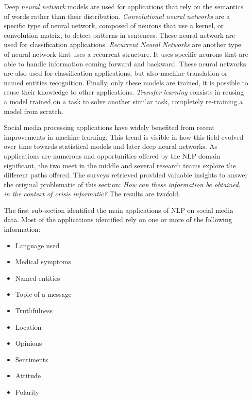 Deep \emph{neural network} models are used for applications that rely on the semantics of words rather than their distribution.
\emph{Convolutional neural networks} are a specific type of neural network, composed of neurons that use a kernel, or convolution matrix, to detect patterns in sentences.
These neural network are used for classification applications.
\emph{Recurrent Neural Networks} are another type of neural network that uses a recurrent structure.
It uses specific neurons that are able to handle information coming forward and backward.
These neural networks are also used for classification applications, but also machine translation or named entities recognition.
Finally, only these models are trained, it is possible to reuse their knowledge to other applications.
\emph{Transfer learning} consists in reusing a model trained on a task to solve another similar task, completely re-training a model from scratch.

Social media processing applications have widely benefited from recent improvements in machine learning.
This trend is visible in how this field evolved over time towards statistical models and later deep neural networks.
As applications are numerous and opportunities offered by the NLP domain significant, the two meet in the middle and several research teams explore the different paths offered.
The surveys retrieved provided valuable insights to answer the original problematic of this section: \emph{How can these information be obtained, in the context of crisis informatic?}
The results are twofold.

The first sub-section identified the main applications of NLP on social media data.
Most of the applications identified rely on one or more of the following information:

\begin{itemize}
    \item Language used
    \item Medical symptoms
    \item Named entities
    \item Topic of a message
    \item Truthfulness
    \item Location
    \item Opinions
    \item Sentiments
    \item Attitude
    \item Polarity
\end{itemize}

